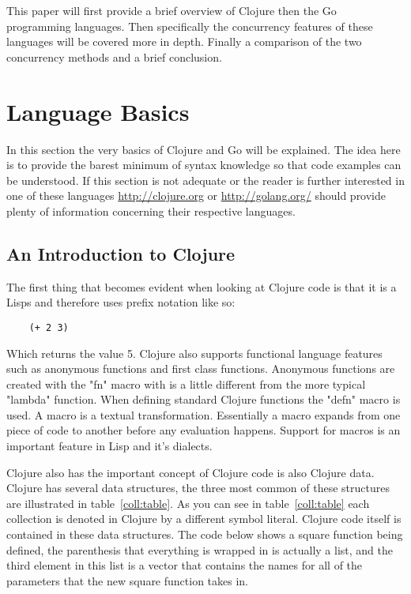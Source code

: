 \documentclass{acm_proc_article-sp}
\begin{document}
	This paper will first provide a brief overview of Clojure then the Go programming languages. Then specifically the concurrency features of these languages will be covered more in depth. Finally a comparison of the two concurrency methods and a brief conclusion.
	
\section{Language Basics}
	In this section the very basics of Clojure and Go will be explained. The idea here is to provide the barest minimum of syntax knowledge so that code examples can be understood. If this section is not adequate or the reader is further interested in one of these languages \url{http://clojure.org} or \url{http://golang.org/} should provide plenty of information concerning their respective languages.
	
\subsection{An Introduction to Clojure}
	The first thing that becomes evident when looking at Clojure code is that it is a Lisps and therefore uses prefix notation like so:
	\begin{verbatim}
	(+ 2 3)
	\end{verbatim}
	Which returns the value 5. Clojure also supports functional language features such as anonymous functions and first class functions. Anonymous functions are created with the "fn" macro with is a little different from the more typical "lambda" function. When defining standard Clojure functions the "defn" macro is used. A macro is a textual transformation. Essentially a macro expands from one piece of code to another before any evaluation happens. Support for macros is an important feature in Lisp and it's dialects.

	Clojure also has the important concept of Clojure code is also Clojure data. Clojure has several data structures, the three most common of these structures are illustrated in table~\ref{coll:table}. As you can see in table~\ref{coll:table} each collection is denoted in Clojure by a different symbol literal. Clojure code itself is contained in these data structures. The code below shows a square function being defined, the parenthesis that everything is wrapped in is actually a list, and the third element in this list is a vector that contains the names for all of the parameters that the new square function takes in.
	
\end{document}
